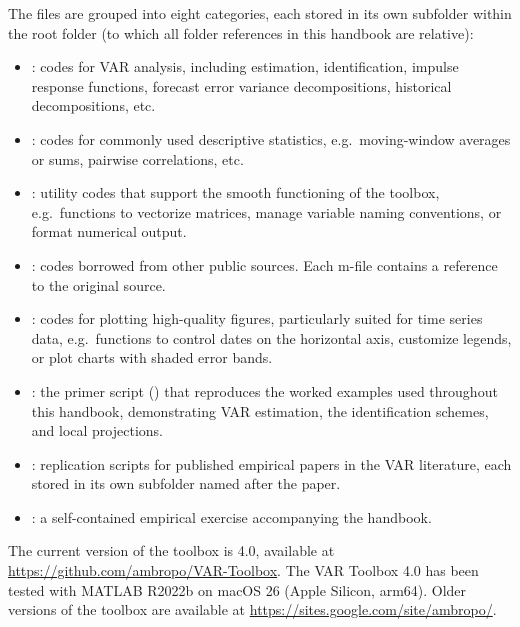 \documentclass[12pt]{article}
\begin{document}
\noindent The files are grouped into eight categories, each stored in its own subfolder within the root folder (to which all folder references in this handbook are relative):

\begin{itemize}
	\item {}: codes for VAR analysis, including estimation, identification, impulse response functions, forecast error variance decompositions, historical decompositions, etc.
	\item {}: codes for commonly used descriptive statistics, e.g.\ moving-window averages or sums, pairwise correlations, etc.
	\item {}: utility codes that support the smooth functioning of the toolbox, e.g.\ functions to vectorize matrices, manage variable naming conventions, or format numerical output.
	\item {}: codes borrowed from other public sources. Each m-file contains a reference to the original source.
	\item {}: codes for plotting high-quality figures, particularly suited for time series data, e.g.\ functions to control dates on the horizontal axis, customize legends, or plot charts with shaded error bands.
	\item {}: the primer script () that reproduces the worked examples used throughout this handbook, demonstrating VAR estimation, the identification schemes, and local projections.
	\item {}: replication scripts for published empirical papers in the VAR literature, each stored in its own subfolder named after the paper.
	\item {}: a self-contained empirical exercise accompanying the handbook.
\end{itemize}

The current version of the toolbox is 4.0, available at \url{https://github.com/ambropo/VAR-Toolbox}. The VAR Toolbox 4.0 has been tested with MATLAB R2022b on macOS 26 (Apple Silicon, arm64). Older versions of the toolbox are available at \url{https://sites.google.com/site/ambropo/}. 
\end{document}
